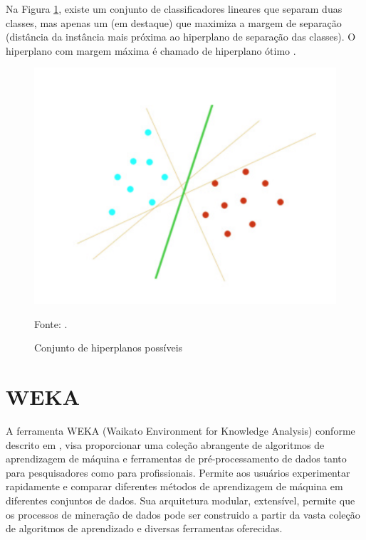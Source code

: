 \documentclass[
	12pt,				%
	openright,			%
	oneside,	
	a4paper,				%
	english,				%
	brazil				%
]{abntex2/abntex2} %
\begin{document}
	Na Figura \ref{figsvmHiperPlanos}, existe um conjunto de classificadores lineares que separam duas classes, mas apenas um (em destaque) que maximiza a margem de separação (distância da instância mais próxima ao hiperplano de separação das classes). O hiperplano com margem máxima é chamado de hiperplano ótimo \cite{junior:2010}.
	\\
	\begin{figure}[!htb]
		\caption{\label{figsvmHiperPlanos} Conjunto de hiperplanos possíveis}
		\begin{center}
			\includegraphics[scale=0.5]{img/svmHiperPlanos.png}
		\end{center}
		Fonte: \cite{junior:2010}.
	\end{figure}

	\section{WEKA}
	
	A ferramenta WEKA (Waikato Environment for Knowledge Analysis)  conforme descrito em \cite{hall:2009}, visa proporcionar uma coleção abrangente de algoritmos de aprendizagem de máquina e ferramentas de pré-processamento de dados tanto para pesquisadores como para profissionais. Permite aos usuários experimentar rapidamente e comparar diferentes métodos de aprendizagem de máquina em diferentes conjuntos de dados. Sua arquitetura modular, extensível, permite que os processos de mineração de dados pode ser construido a partir da vasta coleção de algoritmos de aprendizado e diversas ferramentas oferecidas.
		
\end{document}
